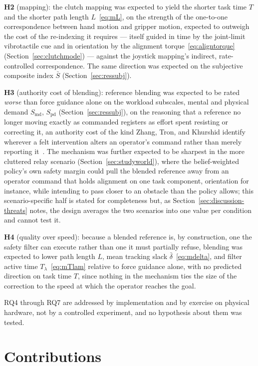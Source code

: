 \documentclass[12pt,a4paper,twoside,openright]{report}
\begin{document}
\textbf{H2} (mapping): the clutch mapping was expected to yield the shorter task time $T$ and the shorter path length $L$~\eqref{eq:mL}, on the strength of the one-to-one correspondence between hand motion and gripper motion, expected to outweigh the cost of the re-indexing it requires --- itself guided in time by the joint-limit vibrotactile cue and in orientation by the alignment torque~\eqref{eq:aligntorque} (Section~\ref{sec:clutchmode}) --- against the joystick mapping's indirect, rate-controlled correspondence. The same direction was expected on the subjective composite index $\bar{S}$ (Section~\ref{sec:ressubj}).

\textbf{H3} (authority cost of blending): reference blending was expected to be rated \emph{worse} than force guidance alone on the workload subscales, mental and physical demand $S_{\mathrm{md}}$, $S_{\mathrm{pd}}$ (Section~\ref{sec:ressubj}), on the reasoning that a reference no longer moving exactly as commanded registers as effort spent resisting or correcting it, an authority cost of the kind Zhang, Tron, and Khurshid identify wherever a felt intervention alters an operator's command rather than merely reporting it~\cite{zhang2021hapticagreement}. The mechanism was further expected to be sharpest in the more cluttered relay scenario (Section~\ref{sec:studyworld}), where the belief-weighted policy's own safety margin could pull the blended reference away from an operator command that holds alignment on one task component, orientation for instance, while intending to pass closer to an obstacle than the policy allows; this scenario-specific half is stated for completeness but, as Section~\ref{sec:discussion-threats} notes, the design averages the two scenarios into one value per condition and cannot test it.

\textbf{H4} (quality over speed): because a blended reference is, by construction, one the safety filter can execute rather than one it must partially refuse, blending was expected to lower path length $L$, mean tracking slack $\bar{\delta}$~\eqref{eq:mdelta}, and filter active time $T_{\lambda}$~\eqref{eq:mTlam} relative to force guidance alone, with no predicted direction on task time $T$, since nothing in the mechanism ties the size of the correction to the speed at which the operator reaches the goal.

RQ4 through RQ7 are addressed by implementation and by exercise on physical hardware, not by a controlled experiment, and no hypothesis about them was tested.

\section{Contributions}
\label{sec:contributions}
\end{document}

